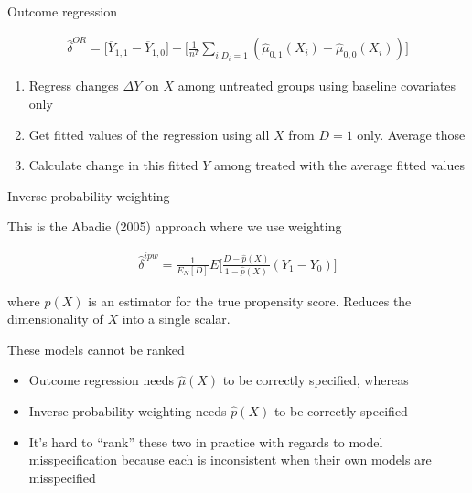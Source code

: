 \documentclass{beamer}
\begin{document}
\begin{frame}{Outcome regression}

\begin{eqnarray*}
\widehat{\delta}^{OR} =\bigg [  \overline{Y}_{1,1} - \overline{Y}_{1,0}\bigg ] - \bigg [  \frac{1}{n^T} \sum_{i|D_i=1} ( \widehat{\mu}_{0,1}(X_i) - \widehat{\mu}_{0,0}(X_i)) \bigg ]
\end{eqnarray*}

\begin{enumerate}
\item Regress changes $\Delta Y$ on $X$ among untreated groups using baseline covariates only
\item Get fitted values of the regression using all $X$ from $D=1$ only.  Average those
\item Calculate change in this fitted $Y$ among treated with the average fitted values
\end{enumerate}

\end{frame}

\begin{frame}{Inverse probability weighting}

This is the Abadie (2005) approach where we use weighting

\begin{eqnarray*}
\widehat{\delta}^{ipw} = \frac{1}{E_N[D]} E \bigg [ \frac{D-\widehat{p}(X)}{1-\widehat{p}(X)} (Y_1-Y_0) \bigg ]
\end{eqnarray*}

where $\widehat{p}(X)$ is an estimator for the true propensity score. Reduces the dimensionality of $X$ into a single scalar.

\end{frame}

\begin{frame}{These models cannot be ranked}

\begin{itemize}
\item Outcome regression needs $\widehat{\mu}(X)$ to be correctly specified, whereas
\item Inverse probability weighting needs $\widehat{p}(X)$ to be correctly specified
\item It's hard to ``rank'' these two in practice with regards to model misspecification because each is inconsistent when their own models are misspecified
\end{itemize}

\end{frame}
\end{document}
